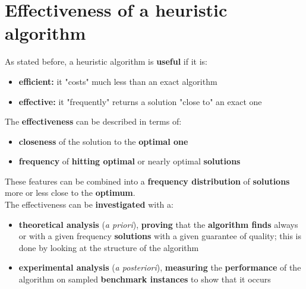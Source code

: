 \section{Effectiveness of a heuristic algorithm}
As stated before, a heuristic algorithm is \textbf{useful} if it is: 
\begin{itemize}
	\item \textbf{efficient:} it "costs" much less than an exact algorithm
	\item \textbf{effective:} it "frequently" returns a solution "close to" an exact one
\end{itemize}
The \textbf{effectiveness} can be described in terms of: 
\begin{itemize}
	\item \textbf{closeness} of the solution to the \textbf{optimal one} 
	\item \textbf{frequency} of \textbf{hitting optimal} or nearly optimal \textbf{solutions}
\end{itemize}
These features can be combined into a \textbf{frequency distribution} of \textbf{solutions} more or less close to the \textbf{optimum}.\\

The effectiveness can be \textbf{investigated} with a: 
\begin{itemize}
	\item \textbf{theoretical analysis} (\textit{a priori}), \textbf{proving} that the \textbf{algorithm finds} always or with a given frequency \textbf{solutions} with a given guarantee of quality; this is done by looking at the structure of the algorithm
	\item \textbf{experimental analysis} (\textit{a posteriori}), \textbf{measuring} the \textbf{performance} of the algorithm on sampled \textbf{benchmark instances} to show that it occurs
\end{itemize}

\newpage

